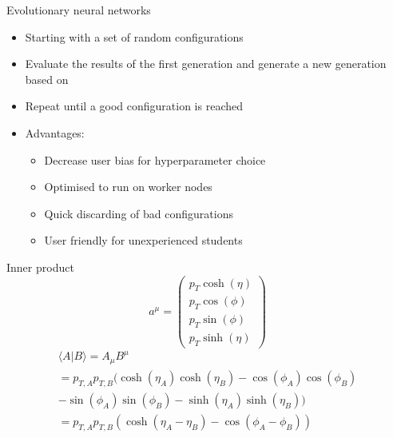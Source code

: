 \begin{frame}{Evolutionary neural networks}
    \begin{itemize}
        \item Starting with a set of random configurations
        \vspace{0.2cm}
        \item Evaluate the results of the first generation and generate a new generation based on 
        \vspace{0.2cm}
        \item Repeat until a good configuration is reached
        \vspace{0.2cm}
        \item Advantages:
            \begin{itemize}
                \item Decrease user bias for hyperparameter choice
                \item Optimised to run on worker nodes
                \item Quick discarding of bad configurations
                \item User friendly for unexperienced students
            \end{itemize}
    \end{itemize}
\end{frame}

\begin{frame}{Inner product}
    \begin{equation*}
        a^{\mu} = \begin{pmatrix}
            p_T \cosh ( \eta ) \\
            p_T \cos ( \phi ) \\
            p_T \sin ( \phi ) \\
            p_T \sinh ( \eta ) \end{pmatrix}
    \end{equation*}
    \begin{align*}
        \langle A | B \rangle = A_{\mu} B^{\mu}\\
        = p_{T,A} p_{T,B} ( \cosh ( \eta_A ) \cosh ( \eta_B ) - \cos ( \phi_A ) \cos ( \phi_B)\\
        - \sin ( \phi_A ) \sin ( \phi_B ) -\sinh ( \eta_A ) \sinh ( \eta_B ) )\\
        = p_{T,A} p_{T,B} \left( \cosh ( \eta_A - \eta_B ) - \cos ( \phi_A - \phi_B ) \right)
    \end{align*}
\end{frame}